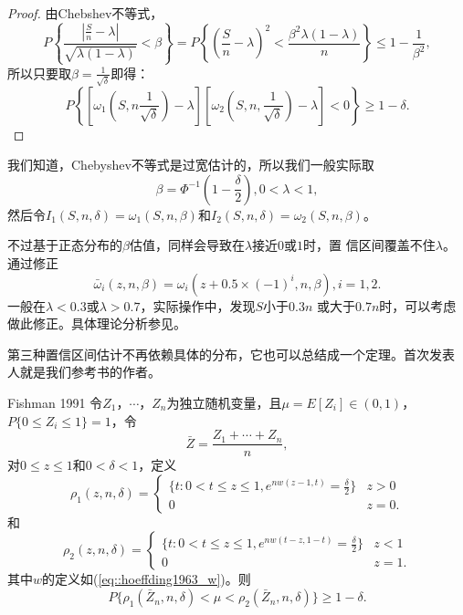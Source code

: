 \begin{proof}
  由Chebshev不等式，
  \begin{equation}
    P\left\{\frac{\left|\frac{S}{n} - \lambda\right|}{\sqrt{\lambda(1
        - \lambda)}} < \beta\right\} = P\left\{(\frac{S}{n} -
    \lambda)^2 < \frac{\beta^2 \lambda (1 - \lambda)}{n}\right\} \leq
    1 -\frac{1}{\beta^2},
    \label{eq::proof_conf_int2}
  \end{equation}
  所以只要取$\beta = \frac{1}{\sqrt{\delta}}$即得：
  \begin{equation}
    P\left\{\left[\omega_1(S, n \frac{1}{\sqrt{\delta}}) -
      \lambda\right]\left[\omega_2(S, n, \frac{1}{\sqrt{\delta}}) -
      \lambda\right] < 0\right\} \geq 1 - \delta.
  \end{equation}
\end{proof}

我们知道，Chebyshev不等式是过宽估计的，所以我们一般实际取
$$
\beta = \Phi^{-1}(1 - \frac{\delta}{2}), 0 < \lambda < 1,
$$
然后令$I_1(S, n, \delta) = \omega_1(S, n, \beta)$和$I_2(S, n,
\delta) = \omega_2(S, n, \beta)$。

不过基于正态分布的$\beta$估值，同样会导致在$\lambda$接近$0$或$1$时，置
信区间覆盖不住$\lambda$。通过修正
\begin{equation}
  \bar{\omega}_i(z, n, \beta) = \omega_i(z + 0.5 \times (-1)^i, n,
  \beta), i = 1, 2.
  \label{eq::con_corr}
\end{equation}
一般在$\lambda < 0.3$或$\lambda > 0.7$，实际操作中，发现$S$小于$0.3n$
或大于$0.7n$时，可以考虑做此修正。具体理论分析参见\cite{Blyth1983Binomial}。

第三种置信区间估计不再依赖具体的分布，它也可以总结成一个定理。首次发表
人就是我们参考书的作者。

\begin{theorem}{\hei Fishman 1991}
  令$Z_1$，$\cdots$，$Z_n$为独立随机变量，且$\mu = E[Z_i] \in (0, 1)$，
  $P\{0 \leq Z_i \leq 1\} = 1$，令
  $$
  \bar{Z} = \frac{Z_1 + \cdots + Z_n}{n},
  $$
  对$0 \leq z \leq 1$和$0 < \delta < 1$，定义
  \begin{equation}
    \rho_1(z, n, \delta) = \left\{ \begin{array}{ll}
      \{t : 0 < t \leq z \leq 1, e^{n w(z - 1, t)} = \frac{\delta}{2} \}& z > 0\\
      0 & z = 0.
      \end{array}
      \right.
      \label{eq::conf_int3_rho_1}
    \end{equation}
    和
    \begin{equation}
      \rho_2(z, n, \delta) = \left\{ \begin{array}{ll}
      \{t : 0 < t \leq z \leq 1, e^{n w(t - z, 1 - t)} = \frac{\delta}{2} \}& z < 1\\
      0 & z = 1.
      \end{array}
      \right.
      \label{eq::conf_int3_rho_1}
      \end{equation}
      其中$w$的定义如(\ref{eq::hoeffding1963_w})。则
      $$
      P\{\rho_1(\bar{Z}_n, n, \delta) < \mu < \rho_2(\bar{Z}_n, n, \delta)\} \geq 1 - \delta.
      $$
    \label{thm::conf_int3}
\end{theorem}

